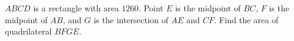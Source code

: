 $ABCD$ is a rectangle with area $1260$. Point $E$ is the midpoint of $BC$, $F$ is the midpoint of $AB$, and $G$ is the intersection of $AE$ and $CF$. Find the area of quadrilateral $BFGE$.
